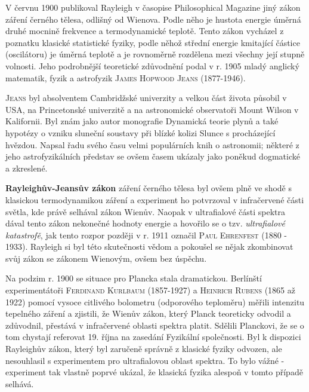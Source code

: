         V červnu 1900 publikoval Rayleigh v časopise Philosophical Magazine jiný zákon záření
        černého tělesa, odlišný od Wienova. Podle něho je hustota energie úměrná druhé mocnině
        frekvence a termodynamické teplotě. Tento zákon vycházel z poznatku klasické statistické
        fyziky, podle něhož střední energie kmitající částice (oscilátoru) je úměrná teplotě a je
        rovnoměrně rozdělena mezi všechny její stupně volnosti. Jeho podrobnější teoretické
        zdůvodnění podal v r. 1905 mladý anglický matematik, fyzik a astrofyzik \textsc{James
        Hopwood Jeans} (1877-1946).

        \begin{tcnote}
          \textsc{Jeans} byl absolventem Cambridžské univerzity a velkou část života působil v USA,
          na Princetonské univerzitě a na astronomické observatoři Mount Wilson v Kalifornii. Byl
          znám jako autor monografie Dynamická teorie plynů a také hypotézy o vzniku sluneční
          soustavy při blízké kolizi Slunce s procházející hvězdou. Napsal řadu svého času velmi
          populárních knih o astronomii; některé z jeho astrofyzikálních představ se ovšem časem
          ukázaly jako poněkud dogmatické a zkreslené.
        \end{tcnote}
      
        \textbf{Rayleighův-Jeansův zákon} záření černého tělesa byl ovšem plně ve shodě s klasickou
        termodynamikou záření a experiment ho potvrzoval v infračervené části světla, kde právě
        selhával zákon Wienův. Naopak v ultrafialové části spektra dával tento zákon nekonečné
        hodnoty energie a hovořilo se o tzv. \emph{ultrafialové katastrofě}, jak tento rozpor
        později v r. 1911 označil \textsc{Paul Ehrenfest} (1880 - 1933). Rayleigh si byl této
        skutečnosti vědom a pokoušel se nějak zkombinovat svůj zákon se zákonem Wienovým, ovšem bez
        úspěchu. 

        Na podzim r. 1900 se situace pro Plancka stala dramatickou. Berlínští experimentátoři
        \textsc{Ferdinand Kurlbaum} (1857-1927) a \textsc{Heinrich Rubens} (1865 až 1922) pomocí
        vysoce citlivého bolometru (odporového teploměru) měřili intenzitu tepelného záření a
        zjistili, že Wienův zákon, který Planck teoreticky odvodil a zdůvodnil, přestává v
        infračervené oblasti spektra platit. Sdělili Planckovi, že se o tom chystají referovat 19.
        října na zasedání Fyzikální společnosti. Byl k dispozici Rayleighův zákon, který byl
        zaručeně správně z klasické fyziky odvozen, ale nesouhlasil s experimentem pro ultrafialovou
        oblast spektra. To bylo vážné - experiment tak vlastně poprvé ukázal, že klasická fyzika
        alespoň v tomto případě selhává.

